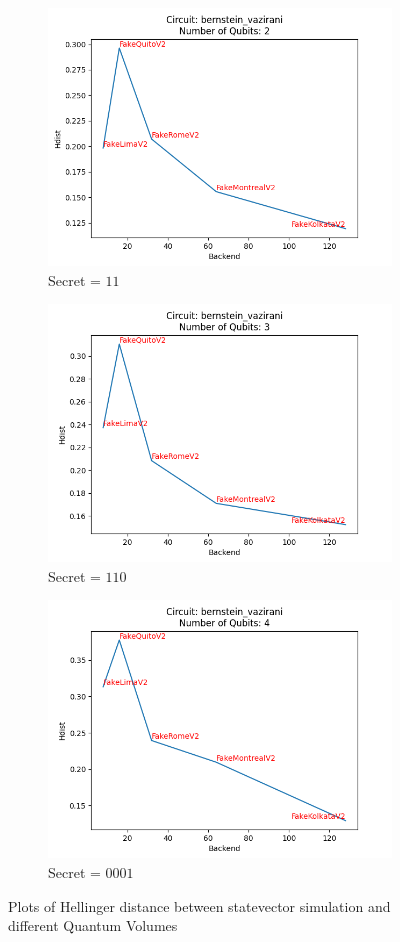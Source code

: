 \documentclass[11pt]{article}
\begin{document}
\begin{figure}[hbtp]
    \begin{subfigure}{0.5\linewidth}
        \centering
        \includegraphics[width=0.9\linewidth]{outputs/bernstein_vazirani_2.png}
        \caption{Secret = $11$}
    \end{subfigure}
    \begin{subfigure}{0.5\linewidth}
        \centering
        \includegraphics[width=0.9\linewidth]{outputs/bernstein_vazirani_3.png}
        \caption{Secret = $110$}
    \end{subfigure}
    \begin{subfigure}{\linewidth}
        \centering
        \includegraphics[width=0.45\linewidth]{outputs/bernstein_vazirani_4.png}
        \caption{Secret = $0001$}
    \end{subfigure}
    \caption{Plots of Hellinger distance between statevector simulation and different Quantum Volumes}
    \label{fig:bvplots}
\end{figure}
\end{document}
